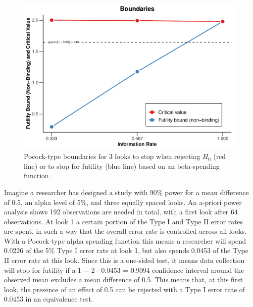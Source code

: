 \documentclass[
  english,
  ,man,floatsintext]{apa6}
\begin{document}
\begin{figure}
\centering
\includegraphics{sequential_tutorial_files/figure-latex/futility2-1.pdf}
\caption{\label{fig:futility2}Pocock-type boundaries for 3 looks to stop when rejecting \(H_0\) (red line) or to stop for futility (blue line) based on an beta-spending function.}
\end{figure}

Imagine a researcher has designed a study with 90\% power for a mean difference of 0.5, an alpha level of 5\%, and three equally spaced looks. An a-priori power analysis shows 192 observations are needed in total, with a first look after 64 observations. At look 1 a certain portion of the Type I and Type II error rates are spent, in such a way that the overall error rate is controlled across all looks. With a Pocock-type alpha spending function this means a researcher will spend 0.0226 of the 5\% Type I error rate at look 1, but also spends 0.0453 of the Type II error rate at this look.
Since this is a one-sided test, it means data collection will stop for futility if a 1 \(-\) 2 \(\cdot\) 0.0453 = 0.9094 confidence interval around the observed mean excludes a mean difference of 0.5. This means that, at this first look, the presence of an effect of 0.5 can be rejected with a Type I error rate of 0.0453 in an equivalence test.
\end{document}
